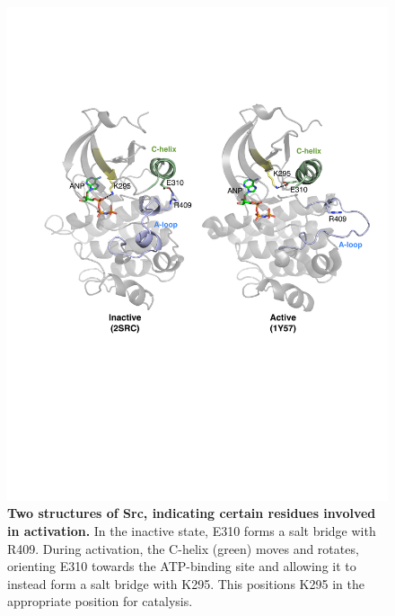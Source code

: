 \documentclass[aps,pre,twocolumn,nofootinbib,superscriptaddress,linenumbers]{revtex4-1}
\begin{document}

\begin{figure}[tb]
    \includegraphics[width=1.0\textwidth]{residue_pair_distances/src/src_ref_structures}
    
    \caption{{\bf Two structures of Src, indicating certain residues involved in activation.}
    In the inactive state, E310 forms a salt bridge with R409.
    During activation, the C-helix (green) moves and rotates, orienting E310 towards the ATP-binding site and allowing it to instead form a salt bridge with K295.
    This positions K295 in the appropriate position for catalysis.
  }
  \label{figure:src-ref-structures}
\end{figure}

\end{document}

